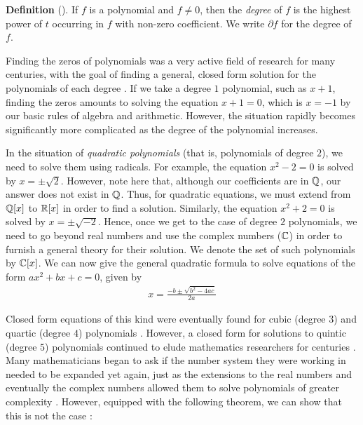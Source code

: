 \documentclass[11pt, a4paper, oneside]{article}
\theoremstyle{plain}
\theoremstyle{plain}
\theoremstyle{plain}
\theoremstyle{plain}
\theoremstyle{definition}
\theoremstyle{example}
\begin{document}
\par
\textbf{Definition} (\cite[Definition 2.1]{stewart}). If $f$ is a polynomial and $f \neq 0$, then the \textit{degree} of $f$ is the highest power of $t$ occurring in $f$ with non-zero coefficient. We write $\partial f$ for the degree of $f$.

\par
Finding the zeros of polynomials was a very active field of research for many centuries, with the goal of finding a general, closed form solution for the polynomials of each degree \cite[p. 3-5]{stewart}. If we take a degree $1$ polynomial, such as $x + 1$, finding the zeros amounts to solving the equation $x + 1 = 0$, which is $x = -1$ by our basic rules of algebra and arithmetic. However, the situation rapidly becomes significantly more complicated as the degree of the polynomial increases.

\par
In the situation of \textit{quadratic polynomials} (that is, polynomials of degree $2$), we need to solve them using radicals. For example, the equation $x^2 - 2 = 0$ is solved by $x = \pm \sqrt{2}$. However, note here that, although our coefficients are in $\mathbb{Q}$, our answer does not exist in $\mathbb{Q}$. Thus, for quadratic equations, we must extend from $\mathbb{Q}[x]$ to $\mathbb{R}[x]$ in order to find a solution. Similarly, the equation $x^2 + 2 = 0$ is solved by $x = \pm \sqrt{-2}$. Hence, once we get to the case of degree $2$ polynomials, we need to go beyond real numbers and use the complex numbers ($\mathbb{C}$) in order to furnish a general theory for their solution. We denote the set of such polynomials by $\mathbb{C}[x]$. We can now give the general quadratic formula to solve equations of the form $ax^2 + bx + c = 0$, given by
\begin{align*}
x = \frac{-b \pm \sqrt{b^2 - 4ac}}{2a}
\end{align*}

Closed form equations of this kind were eventually found for cubic (degree $3$) and quartic (degree $4$) polynomials \cite[\S 1.4, p. 25-29]{stewart}. However, a closed form for solutions to quintic (degree $5$) polynomials continued to elude mathematics researchers for centuries \cite[\S 1.4, p. 31]{stewart}. Many mathematicians began to ask if the number system they were working in needed to be expanded yet again, just as the extensions to the real numbers and eventually the complex numbers allowed them to solve polynomials of greater complexity \cite[\S 2.2, p. 39]{stewart}. However, equipped with the following theorem, we can show that this is not the case \cite[\S 2.2, p. 41]{stewart}:
\end{document}
